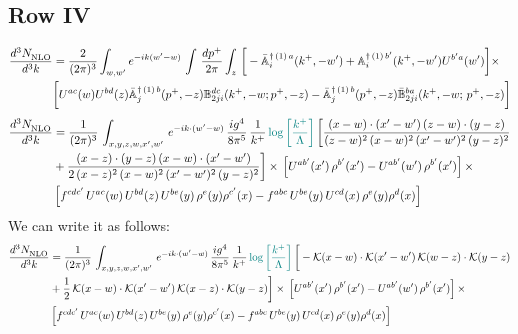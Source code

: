 \documentclass[9pt]{article}
\def\mf#1{\mathbb{#1}}
\numberwithin{equation}{section}
\begin{document}
\subsection{Row IV}
\begin{align}
 \frac{d^{3}N_{\rm NLO}^{\rm}}{d^{3}k}  & = \frac{2}{(2\pi)^{3}}  \int_{w, w^\prime} e^{-ik(w^\prime-w)}\, \int\,\frac{dp^{+}}{2\pi} \int_{z}\,\bigg[-\bar{\mf{A}}^{\dagger\,(1)\,a}_{i}(k^{+},-w^{\prime})+\mf{A}^{\dagger\, (1)\, b^{\prime}}_{i}(k^{+},-w^{\prime})U^{b^{\prime}a}(w^{\prime})\bigg]\times \notag \\ & \bigg[U^{ac}(w)U^{bd}(z) \bar{\mf{A}}^{\dagger\, (1)\, b}_{j}(p^+,- z) {\mf{B}}^{dc}_{2ji} (k^+, -w;p^+, -z) - \Bar{\mf{A}}^{\dagger\, (1)\, b}_{j}(p^{+}, -z)\Bar{\mf{B}}^{ba}_{2ji}(k^{+},-w;\,p^{+}, -z) \bigg] \nonumber
\end{align}
\begin{align}
    \frac{d^{3}N_{\rm NLO}^{\rm}}{d^{3}k}  & =  \frac{1}{(2\pi)^{3}}\,
    \int_{x,y,z,w,x',w'}\,e^{-ik\cdot (w^\prime-w)}\, \frac{ig^{4}}{8\pi^{5}}\,\frac{1}{k^{+}}\,{\color{teal}\log{\left[\frac{k^{+}}{\Lambda}\right]}}\,\bigg[\frac{(x-w)\cdot (x'-w')\,(z-w)\cdot (y-z)}{(z-w)^{2}\,(x-w)^{2}\,(x'-w')^{2}\,(y-z)^{2}}\notag \\ & +\frac{(x-z)\cdot (y-z)\,(x-w)\cdot (x'-w')}{2\, (x-z)^{2}\,(x-w)^{2}\,(x'-w')^{2}\,(y-z)^{2}}\bigg]\times\,\left[U^{ab'}(x')\,\rho^{b'}(x')-U^{ab'}(w')\,\rho^{b'}(x')\right]\times\notag \\ &  \left[f^{cdc'}\,U^{ac}(w)\,U^{bd}(z)\,U^{be}(y)\,\rho^{e}(y)\rho^{c'}(x)-f^{abc}\,U^{be}(y)\,U^{cd}(x)\,\rho^{e}(y)\rho^{d}(x)\right]
\end{align}
We can write it as follows:
\begin{align}
    \frac{d^{3}N_{\rm NLO}^{\rm}}{d^{3}k}  & =  \frac{1}{(2\pi)^{3}}\,
    \int_{x,y,z,w,x',w'}\,e^{-ik\cdot (w^\prime-w)}\, \frac{ig^{4}}{8\pi^{5}}\,\frac{1}{k^{+}}\,{\color{teal}\log{\left[\frac{k^{+}}{\Lambda}\right]}}\,\bigg[-\mathcal{K}(x-w)\cdot \mathcal{K}(x'-w')\, \mathcal{K}(w-z)\cdot \mathcal{K}(y-z)\notag \\ & +\frac{1}{2}\,\mathcal{K}(x-w)\cdot \mathcal{K}(x'-w')\, \mathcal{K}(x-z)\cdot \mathcal{K}(y-z)\bigg]\times\,\left[U^{ab'}(x')\,\rho^{b'}(x')-U^{ab'}(w')\,\rho^{b'}(x')\right]\times\notag \\ &  \left[f^{cdc'}\,U^{ac}(w)\,U^{bd}(z)\,U^{be}(y)\,\rho^{e}(y)\rho^{c'}(x)-f^{abc}\,U^{be}(y)\,U^{cd}(x)\,\rho^{e}(y)\rho^{d}(x)\right]
\end{align}
\end{document}
